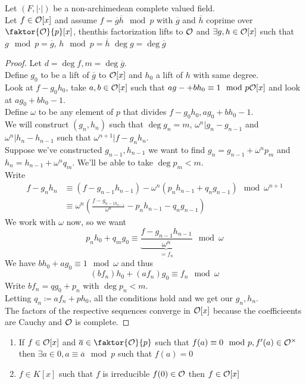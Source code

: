 \documentclass[../main.tex]{subfiles}
\begin{document}
\begin{lemma}[Hensel]
Let $( F,|\cdot|) $ be a non-archimedean complete valued field.\\
Let $f\in \mathcal{O}[x]$ and assume $f= \overline{g}\overline{h} \mod p$ with $\overline{g}$ and $\overline{h}$ coprime over $ \faktor{\O}{p}[x]$, thenthis factorization lifts to $\mathcal{O}$ and $\exists g,h \in \mathcal{O}[x]$ such that $g \mod p = \overline{g}$, $h \mod p = \overline{h}$ $\deg g= \deg \overline{g}$  
\end{lemma}
\begin{proof}
Let $d= \deg f,m = \deg \overline{g}$.\\
Define $g_0 $ to be a lift of $ \overline{g}$ to $\mathcal{O}[x]$ and $h_0$ a lift of $h$ with same degree.\\
Look at $f- g_0 h_0$, take $a,b \in \mathcal{O}[x]$ such that $ag-+bh_0 \equiv 1 \mod p \mathcal{O}[x]$ and look at $ag_0+bh_0-1$.\\
Define $\omega$ to be any element of $p$ that divides $f-g_0h_0, ag_0+bh_0-1$.\\
We will construct $( g_n, h_n) $ such that $\deg g_n = m$, $\omega^{n}| g_n - g_{n-1} $ and $\omega^{n}| h_{n} - h_{n-1} $ such that $ \omega^{n+1}| f- g_n h_n$.\\
Suppose we've constructed $g_{n-1} , h_{n-1} $ we want to find $g_n = g_{n-1} + \omega^{n} p_m$ and $h_n = h_{n-1} + \omega^{n} q_m$. We'll be able to take $\deg p_m <m$.\\
Write 
\begin{align*}
	f- g_n h_n&\equiv ( f- g_{n-1} h_{n-1} ) - \omega^{n}( p_n h_{n-1} + q_n g_{n-1} )\mod \omega^{n+1}  \\
		  & \equiv \omega^{n}( \frac{f- g_{n-1h_{n-1} } }{\omega^{n}}- p_n h_{n-1} - q_n g_{n-1} )
\end{align*}
We work with $\omega$ now, so we want 
\[ 
p_n h_0 + q_m g_0 \equiv \underbrace{\frac{f - g_{n-1} h_{n-1} }{\omega^{n}}}_{=f_n}\mod \omega
\]
We have $bh_0 + ag_0 \equiv 1 \mod \omega$ and thus
\[ 
	( bf_n) h_0 + ( af_n) g_0 \equiv f_n \mod \omega
\]
Write $bf_n = qg_0 +p_n$ with $\deg p_n< m$.\\
Letting $q_n \coloneqq  af_n + p h_0$, all the conditions hold and we get our $g_n,h_n$.\\
The factors of the respective sequences converge in $\mathcal{O}[x]$ because the coefficieents are Cauchy and $\mathcal{O}$ is complete.

\end{proof}
\begin{exemple}
\begin{enumerate}
	\item If $f\in \mathcal{O}[x]$ and $\overline{a} \in \faktor{\O}{p}$ such that $f( a) \equiv 0 \mod p, f'( a) \in \mathcal{O}^{\times}$ then $\exists a \in 0, a \equiv \overline{a}\mod p$ such that $f( a) =0$ 
	\item $f\in K[x]$ such that $f $ is irreducible $f( 0) \in \mathcal{O} $ then $f\in \mathcal{O}[x]$ 
\end{enumerate}

\end{exemple}
\end{document}
